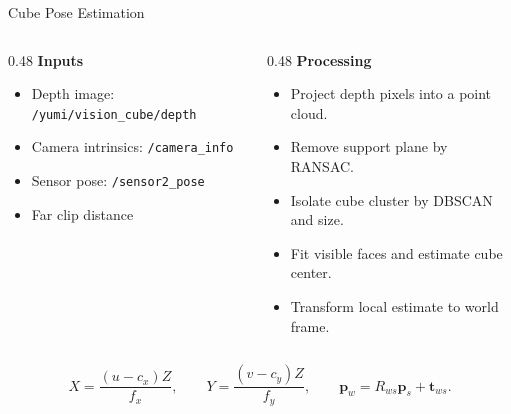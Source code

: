 \documentclass[10pt,aspectratio=169]{beamer}
\begin{document}
\begin{frame}{Cube Pose Estimation}
  \begin{columns}[T]
    \begin{column}{0.48\textwidth}
      \textbf{Inputs}
      \begin{itemize}
        \item Depth image: \texttt{/yumi/vision\_cube/depth}
        \item Camera intrinsics: \texttt{/camera\_info}
        \item Sensor pose: \texttt{/sensor2\_pose}
        \item Far clip distance
      \end{itemize}
    \end{column}
    \begin{column}{0.48\textwidth}
      \textbf{Processing}
      \begin{itemize}
        \item Project depth pixels into a point cloud.
        \item Remove support plane by RANSAC.
        \item Isolate cube cluster by DBSCAN and size.
        \item Fit visible faces and estimate cube center.
        \item Transform local estimate to world frame.
      \end{itemize}
    \end{column}
  \end{columns}

  \vspace{0.35cm}
  \begin{equation*}
    X = \frac{(u-c_x)Z}{f_x}, \qquad
    Y = \frac{(v-c_y)Z}{f_y}, \qquad
    \mathbf{p}_{w} = R_{ws}\mathbf{p}_{s} + \mathbf{t}_{ws}.
  \end{equation*}
\end{frame}
\end{document}
